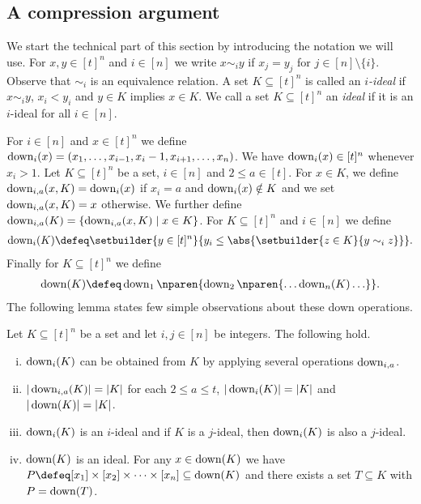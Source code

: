 \subsection{A compression argument}
\label{sec:isoperimetry:comp}
We start the technical part of this section by introducing the
notation we will use. For $x,y\in[t]^n$ and $i\in[n]$ we write
$x\sim_iy$ if $x_j=y_j$ for $j\in[n]\setminus\{i\}$. Observe
that $\sim_i$ is an equivalence relation. A set $K\subseteq
[t]^n$ is called an {\em $i$-ideal} if $x\sim_i y$, $x_i<y_i$
and $y\in K$ implies $x\in K$. We call a set $K\subseteq[t]^n$
an {\em ideal} if it is an $i$-ideal for all $i\in[n]$.

For $i\in[n]$ and $x\in[t]^n$ we define
$\operatorname{down}_{i}(x)=(x_1,\ldots,x_{i-1},x_i-1,x_{i+1},\ldots,x_n)$. 
We have $\operatorname{down}_i(x)\in[t]^n$ whenever $x_i>1$.
%
Let $K\subseteq [t]^n$ be a set, $i\in[n]$ and $2\le a\in[t]$. 
For $x\in K$, we define $\operatorname{down}_{i,a}(x,K)=\operatorname{down}_i(x)$ if 
$x_i=a$ and $\operatorname{down}_i(x)\notin K$ and we set 
$\operatorname{down}_{i,a}(x,K)=x$ otherwise. We further define
$\operatorname{down}_{i,a}(K)=\{\operatorname{down}_{i,a}(x,K)\mid x\in K\}$.
For $K\subseteq[t]^n$ and $i\in[n]$ we define
\begin{align*}
\down_i(K)\defeq\setbuilder{y\in[t]^n}{y_i\le\abs{\setbuilder{z\in K}{y\sim_iz}}}.
\end{align*}
Finally for $K\subseteq[t]^n$ we define
\begin{align*}
\down(K)\defeq\down_1\nparen{\down_2\nparen{\ldots\down_n(K)\ldots}}.
\end{align*}
The following lemma states few simple observations about these
down operations.
\begin{lemma}
\label{lem:down}
Let $K\subseteq[t]^n$ be a set and let $i,j\in[n]$ be integers. 
The following hold.
\begin{enumerate}[(i)]
\item $\operatorname{down}_i(K)$ can be obtained from $K$ by applying several
  operations $\operatorname{down}_{i,a}$.
\item $|\operatorname{down}_{i,a}(K)|=|K|$ for each $2\le a\le t$, 
$|\operatorname{down}_i(K)|=|K|$ and $|\operatorname{down}(K)|=|K|$.
\item $\operatorname{down}_i(K)$ is an $i$-ideal and
if $K$ is a $j$-ideal, then $\operatorname{down}_i(K)$ is also a $j$-ideal.
\item $\operatorname{down}(K)$ is an ideal. For any $x\in\operatorname{down}(K)$ we have 
$P\defeq[x_1]\times[x_2]\times\cdots\times[x_n]
\subseteq\down(K)$ and there exists a set $T\subseteq K$ with
$P= \operatorname{down}(T)$.
\end{enumerate}
\end{lemma}
